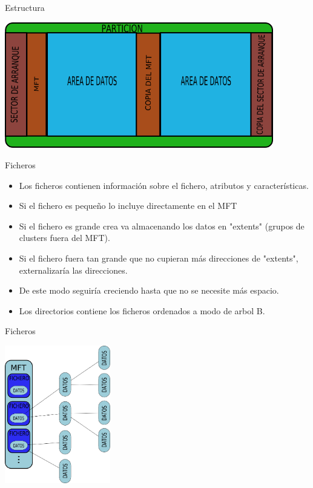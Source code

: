 \begin{frame}{Estructura}
  \begin{center}
    \includegraphics[height=5.5cm]{imgs/ntfs_struct.png}
  \end{center}
\end{frame}

\begin{frame}{Ficheros}
  \begin{itemize}
    \item Los ficheros contienen información sobre el fichero, atributos y características.
    \item Si el fichero es pequeño lo incluye directamente en el MFT
    \item Si el fichero es grande crea va almacenando los datos en "extents" (grupos de clusters fuera del MFT).
    \item Si el fichero fuera tan grande que no cupieran más direcciones de "extents", externalizaría las direcciones.
    \item De este modo seguiría creciendo hasta que no se necesite más espacio.
    \item Los directorios contiene los ficheros ordenados a modo de arbol B.
  \end{itemize}
\end{frame}

\begin{frame}{Ficheros}
  \begin{center}
    \includegraphics[height=6cm]{imgs/ntfs_files.png}
  \end{center}
\end{frame}
